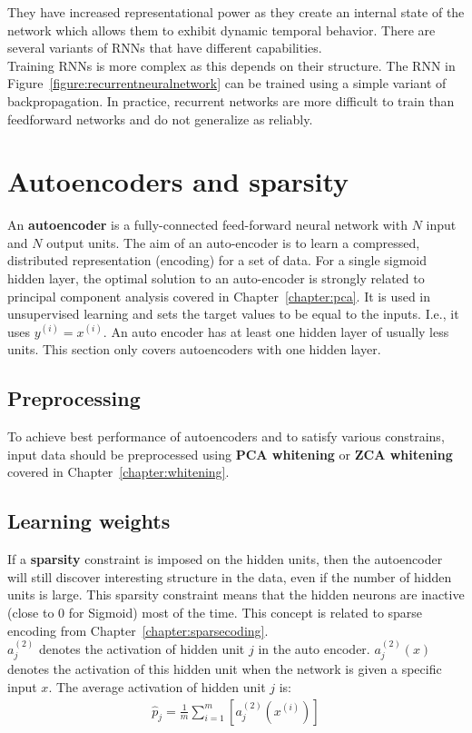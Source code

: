 \documentclass{report}
\begin{document}
They have increased representational power as they create an internal state of the network which allows them to exhibit dynamic temporal behavior. There are several variants of RNNs that have different capabilities.
\\
Training RNNs is more complex as this depends on their structure. The RNN in Figure~\ref{figure:recurrentneuralnetwork} can be trained using a simple variant of backpropagation.
In practice, recurrent networks are more difficult to train than feedforward networks and do not generalize as reliably.

\section{Autoencoders and sparsity}
\label{chapter:autoencoders}
An {\bf autoencoder} is a fully-connected feed-forward neural network with $N$ input and $N$ output units.
The aim of an auto-encoder is to learn a compressed, distributed representation (encoding) for a set of data.
For a single sigmoid hidden layer, the optimal solution to an auto-encoder is strongly related to principal component analysis covered in Chapter~\ref{chapter:pca}.
It is used in unsupervised learning and sets the target values to be equal to the inputs. I.e., it uses $y^{(i)} = x^{(i)}$.
An auto encoder has at least one hidden layer of usually less units. This section only covers autoencoders with one hidden layer.

\subsection{Preprocessing}
To achieve best performance of autoencoders and to satisfy various constrains, input data should be preprocessed using {\bf PCA whitening} or {\bf ZCA whitening} covered in Chapter~\ref{chapter:whitening}.

\subsection{Learning weights}
If a {\bf sparsity} constraint is imposed on the hidden units, then the autoencoder will still discover interesting structure in the data, even if the number of hidden units is large.
This sparsity constraint means that the hidden neurons are inactive (close to $0$ for Sigmoid) most of the time.
This concept is related to sparse encoding from Chapter~\ref{chapter:sparsecoding}.
\\
$a_j^{(2)}$ denotes the activation of hidden unit $j$ in the auto encoder.
$a_j^{(2)}(x)$ denotes the activation of this hidden unit when the network is given a specific input $x$.
The average activation of hidden unit $j$ is:
\begin{align*}
\hat{p}_j = \frac{1}{m}\sum_{i=1}^m [a_j^{(2)}(x^{(i)})]
\end{align*}
\end{document}

